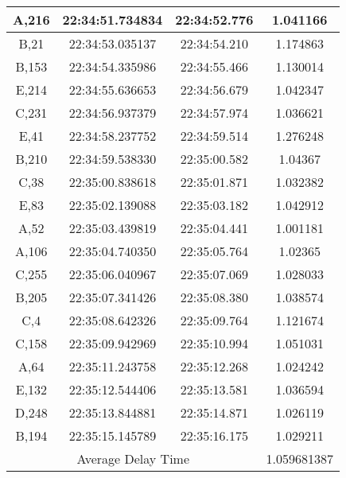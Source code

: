 \begin{longtable}{|ccc|c|}
    \multicolumn{1}{|c|}{A,216} & \multicolumn{1}{c|}{22:34:51.734834} & 22:34:52.776       & 1.041166    \\ \hline
    \multicolumn{1}{|c|}{B,21}  & \multicolumn{1}{c|}{22:34:53.035137} & 22:34:54.210       & 1.174863    \\ \hline
    \multicolumn{1}{|c|}{B,153} & \multicolumn{1}{c|}{22:34:54.335986} & 22:34:55.466       & 1.130014    \\ \hline
    \multicolumn{1}{|c|}{E,214} & \multicolumn{1}{c|}{22:34:55.636653} & 22:34:56.679       & 1.042347    \\ \hline
    \multicolumn{1}{|c|}{C,231} & \multicolumn{1}{c|}{22:34:56.937379} & 22:34:57.974       & 1.036621    \\ \hline
    \multicolumn{1}{|c|}{E,41}  & \multicolumn{1}{c|}{22:34:58.237752} & 22:34:59.514       & 1.276248    \\ \hline
    \multicolumn{1}{|c|}{B,210} & \multicolumn{1}{c|}{22:34:59.538330} & 22:35:00.582       & 1.04367     \\ \hline
    \multicolumn{1}{|c|}{C,38}  & \multicolumn{1}{c|}{22:35:00.838618} & 22:35:01.871       & 1.032382    \\ \hline
    \multicolumn{1}{|c|}{E,83}  & \multicolumn{1}{c|}{22:35:02.139088} & 22:35:03.182       & 1.042912    \\ \hline
    \multicolumn{1}{|c|}{A,52}  & \multicolumn{1}{c|}{22:35:03.439819} & 22:35:04.441       & 1.001181    \\ \hline
    \multicolumn{1}{|c|}{A,106} & \multicolumn{1}{c|}{22:35:04.740350} & 22:35:05.764       & 1.02365     \\ \hline
    \multicolumn{1}{|c|}{C,255} & \multicolumn{1}{c|}{22:35:06.040967} & 22:35:07.069       & 1.028033    \\ \hline
    \multicolumn{1}{|c|}{B,205} & \multicolumn{1}{c|}{22:35:07.341426} & 22:35:08.380       & 1.038574    \\ \hline
    \multicolumn{1}{|c|}{C,4}   & \multicolumn{1}{c|}{22:35:08.642326} & 22:35:09.764       & 1.121674    \\ \hline
    \multicolumn{1}{|c|}{C,158} & \multicolumn{1}{c|}{22:35:09.942969} & 22:35:10.994       & 1.051031    \\ \hline
    \multicolumn{1}{|c|}{A,64}  & \multicolumn{1}{c|}{22:35:11.243758} & 22:35:12.268       & 1.024242    \\ \hline
    \multicolumn{1}{|c|}{E,132} & \multicolumn{1}{c|}{22:35:12.544406} & 22:35:13.581       & 1.036594    \\ \hline
    \multicolumn{1}{|c|}{D,248} & \multicolumn{1}{c|}{22:35:13.844881} & 22:35:14.871       & 1.026119    \\ \hline
    \multicolumn{1}{|c|}{B,194} & \multicolumn{1}{c|}{22:35:15.145789} & 22:35:16.175       & 1.029211    \\ \hline
    \multicolumn{3}{|c|}{Average Delay Time}                                                & 1.059681387 \\ \hline
\end{longtable}

